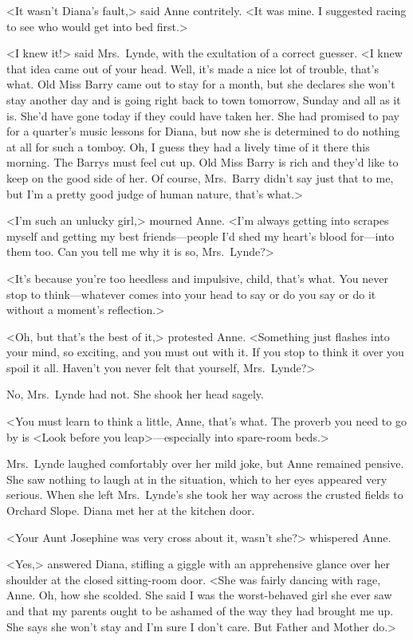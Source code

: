 <It wasn't Diana's fault,> said Anne contritely. <It was mine. I suggested racing to see who would get into bed first.>

<I knew it!> said Mrs.~Lynde, with the exultation of a correct guesser. <I knew that idea came out of your head. Well, it's made a nice lot of trouble, that's what. Old Miss Barry came out to stay for a month, but she declares she won't stay another day and is going right back to town tomorrow, Sunday and all as it is. She'd have gone today if they could have taken her. She had promised to pay for a quarter's music lessons for Diana, but now she is determined to do nothing at all for such a tomboy. Oh, I guess they had a lively time of it there this morning. The Barrys must feel cut up. Old Miss Barry is rich and they'd like to keep on the good side of her. Of course, Mrs.~Barry didn't say just that to me, but I'm a pretty good judge of human nature, that's what.>

<I'm such an unlucky girl,> mourned Anne. <I'm always getting into scrapes myself and getting my best friends—people I'd shed my heart's blood for—into them too. Can you tell me why it is so, Mrs.~Lynde?>

<It's because you're too heedless and impulsive, child, that's what. You never stop to think—whatever comes into your head to say or do you say or do it without a moment's reflection.>

<Oh, but that's the best of it,> protested Anne. <Something just flashes into your mind, so exciting, and you must out with it. If you stop to think it over you spoil it all. Haven't you never felt that yourself, Mrs.~Lynde?>

No, Mrs.~Lynde had not. She shook her head sagely.

<You must learn to think a little, Anne, that's what. The proverb you need to go by is <Look before you leap>—especially into spare-room beds.>

Mrs.~Lynde laughed comfortably over her mild joke, but Anne remained pensive. She saw nothing to laugh at in the situation, which to her eyes appeared very serious. When she left Mrs.~Lynde's she took her way across the crusted fields to Orchard Slope. Diana met her at the kitchen door.

<Your Aunt Josephine was very cross about it, wasn't she?> whispered Anne.

<Yes,> answered Diana, stifling a giggle with an apprehensive glance over her shoulder at the closed sitting-room door. <She was fairly dancing with rage, Anne. Oh, how she scolded. She said I was the worst-behaved girl she ever saw and that my parents ought to be ashamed of the way they had brought me up. She says she won't stay and I'm sure I don't care. But Father and Mother do.>

